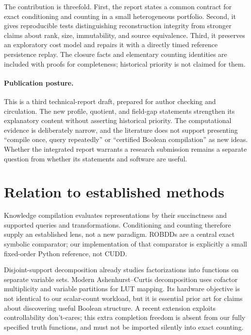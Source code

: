 \documentclass[11pt]{article}
\theoremstyle{definition}\newtheorem{definition}[theorem]{Definition}
\theoremstyle{remark}\newtheorem{remark}[theorem]{Remark}
\begin{document}
The contribution is threefold. First, the report states a common contract for exact conditioning and counting in a small heterogeneous portfolio. Second, it gives reproducible tests distinguishing reconstruction integrity from stronger claims about rank, size, immutability, and source equivalence. Third, it preserves an exploratory cost model and repairs it with a directly timed reference persistence replay. The closure facts and elementary counting identities are included with proofs for completeness; historical priority is not claimed for them.

\paragraph{Publication posture.}
This is a third technical-report draft, prepared for author checking and circulation. The new profile, quotient, and field-gap statements strengthen its explanatory content without asserting historical priority. The computational evidence is deliberately narrow, and the literature does not support presenting ``compile once, query repeatedly'' or ``certified Boolean compilation'' as new ideas. Whether the integrated report warrants a research submission remains a separate question from whether its statements and software are useful.

\section{Relation to established methods}
Knowledge compilation evaluates representations by their succinctness and supported queries and transformations\cite{darwiche2002}. Conditioning and counting therefore supply an established lens, not a new paradigm. ROBDDs are a central exact symbolic comparator\cite{bryant1986}; our implementation of that comparator is explicitly a small fixed-order Python reference, not CUDD.

Disjoint-support decomposition already studies factorizations into functions on separate variable sets\cite{mishchenko2001}. Modern Ashenhurst--Curtis decomposition uses cofactor multiplicity and variable partitions for LUT mapping\cite{calvino2024}. Its hardware objective is not identical to our scalar-count workload, but it is essential prior art for claims about discovering useful Boolean structure. A recent extension exploits controllability don't-cares\cite{hien2025}; this extra completion freedom is absent from our fully specified truth functions, and must not be imported silently into exact counting.
\end{document}
